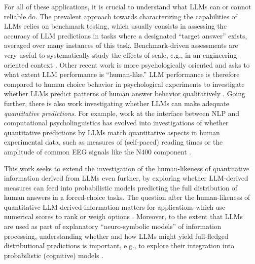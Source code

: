 \documentclass[fleqn]{article}
\begin{document}
For all of these applications, it is crucial to understand what LLMs can or cannot reliable do.
The prevalent approach towards characterizing the capabilities of LLMs relies on benchmark testing, which usually consists in assessing the accuracy of LLM predictions in tasks where a designated ``target answer'' exists, averaged over many instances of this task.
Benchmark-driven assessments are very useful to systematically study the effects of scale, e.g., in an engineering-oriented context \citep[e.g.,][]{srivastava2023-BIGbench}.
Other recent work is more psychologically oriented and asks to what extent LLM performance is ``human-like.''
LLM performance is therefore compared to human choice behavior in psychological experiments to investigate whether LLMs predict patterns of human answer behavior qualitatively \citep[e.g.,][]{BinzSchulz2023:Using-cognitive,Hagendorff2023:Machine-Psychol,ShiffrinMitchell2023:Probing-the-psy}.
Going further, there is also work investigating whether LLMs can make adequate \emph{quantitative predictions}.
For example, work at the interface between NLP and computational psycholinguistics \citep{MarvinLinzen2018:Targeted-Syntac,HuGauthier2020:A-Systematic-As} has evolved into investigations of whether quantitative predictions by LLMs match quantitative aspects in human experimental data, such as measures of (self-paced) reading times \citep{WilcoxVani2021:A-Targeted-Asse} or the amplitude of common EEG signals like the N400 component \citep{LindborgRabovsky2021:Meaning-in-brai}.


This work seeks to extend the investigation of the human-likeness of quantitative information derived from LLMs even further, by exploring whether LLM-derived measures can feed into probabilistic models predicting the full distribution of human answers in a forced-choice tasks.
The question after the human-likeness of quantitative LLM-derived information matters for applications which use numerical scores to rank or weigh options \citep[e.g.,][]{ParkOBrien2023:Generative-Agen,ZhangLehman2023:OMNI:-Open-ende}.
Moreover, to the extent that LLMs are used as part of explanatory ``neuro-symbolic models'' of information processing, understanding whether and how LLMs might yield full-fledged distributional predictions is important, e.g., to explore their integration into probabilistic (cognitive) models \citep[c.f.,][]{Frank2023:Large-language-}.
\end{document}

